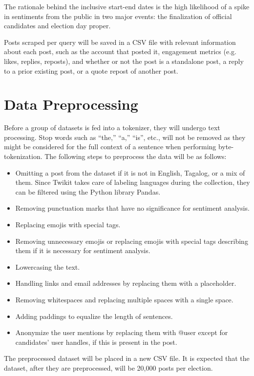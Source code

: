 The rationale behind the inclusive start-end dates is the high likelihood of a spike in sentiments from the public in two major events: the finalization of official candidates and election day proper.

Posts scraped per query will be saved in a CSV file with relevant information about each post, such as the account that posted it, engagement metrics (e.g. likes, replies, reposts), and whether or not the post is a standalone post, a reply to a prior existing post, or a quote repost of another post. 

\section{Data Preprocessing}
Before a group of datasets is fed into a tokenizer, they will undergo text processing.  Stop words such as “the,” “a,” “is”, etc., will not be removed as they might be considered for the full context of a sentence when performing byte-tokenization. The following steps to preprocess the data will be as follows:

\begin{itemize}
    \item Omitting a post from the dataset if it is not in English, Tagalog, or a mix of them. Since Twikit takes care of labeling languages during the collection, they can be filtered using the Python library Pandas.
    \item Removing punctuation marks that have no significance for sentiment analysis.
    \item Replacing emojis with special tags.
    \item Removing unnecessary emojis or replacing emojis with special tags describing them if it is necessary for sentiment analysis.
    \item Lowercasing the text.
    \item Handling links and email addresses by replacing them with a placeholder.
    \item Removing whitespaces and replacing multiple spaces with a single space.
    \item Adding paddings to equalize the length of sentences.
    \item Anonymize the user mentions by replacing them with @user except for candidates’ user handles, if this is present in the post.
\end{itemize}

The preprocessed dataset will be placed in a new CSV file. It is expected that the dataset, after they are preprocessed, will be 20,000 posts per election.

